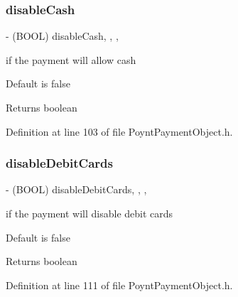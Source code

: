 \hypertarget{interface_poynt_payment_object_af4d70322e9072299e80fa78a54e7094e}{}\label{interface_poynt_payment_object_af4d70322e9072299e80fa78a54e7094e} 
\subsubsection{\texorpdfstring{disable\+Cash}{disableCash}}
{\footnotesize\ttfamily -\/ (B\+O\+OL) disable\+Cash\hspace{0.3cm}{\ttfamily [read]}, {\ttfamily [write]}, {\ttfamily [nonatomic]}, {\ttfamily [assign]}}



if the payment will allow cash 

Default is false

\begin{DoxyReturn}{Returns}
boolean 
\end{DoxyReturn}


Definition at line 103 of file Poynt\+Payment\+Object.\+h.

\hypertarget{interface_poynt_payment_object_a3f9d08fa34a1f60c5818a7b570d8b41f}{}\label{interface_poynt_payment_object_a3f9d08fa34a1f60c5818a7b570d8b41f} 
\subsubsection{\texorpdfstring{disable\+Debit\+Cards}{disableDebitCards}}
{\footnotesize\ttfamily -\/ (B\+O\+OL) disable\+Debit\+Cards\hspace{0.3cm}{\ttfamily [read]}, {\ttfamily [write]}, {\ttfamily [nonatomic]}, {\ttfamily [assign]}}



if the payment will disable debit cards 

Default is false

\begin{DoxyReturn}{Returns}
boolean 
\end{DoxyReturn}


Definition at line 111 of file Poynt\+Payment\+Object.\+h.

\hypertarget{interface_poynt_payment_object_a7b291056797beff707e48865aefe7c5a}{}\label{interface_poynt_payment_object_a7b291056797beff707e48865aefe7c5a} 
